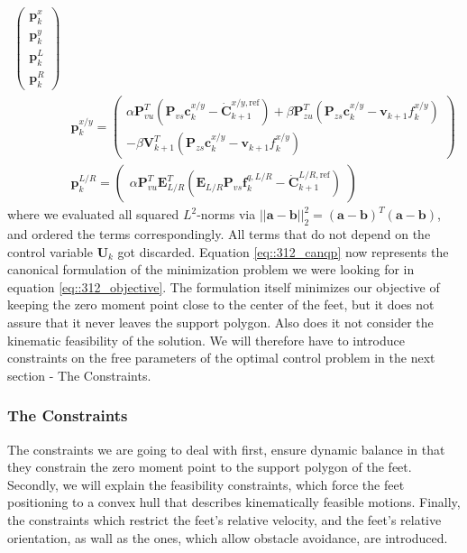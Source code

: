 \begin{align}
\begin{pmatrix}
		\bm{p}_k^x \\
		\bm{p}_k^y \\
		\bm{p}_k^{L} \\
		\bm{p}_k^{R}
	\end{pmatrix} \\
	& \bm{p}_k^{x/y} = \begin{pmatrix}
		\alpha\bm{P}_{vu}^T(\bm{P}_{vs}\bm{c}_k^{x/y}-\dot{\bm{C}}_{k+1}^{x/y,\text{ref}}) + \beta\bm{P}_{zu}^T(\bm{P}_{zs}\bm{c}_k^{x/y}-\bm{v}_{k+1}f_k^{x/y})\\
		-\beta\bm{V}_{k+1}^T(\bm{P}_{zs}\bm{c}_k^{x/y}-\bm{v}_{k+1}f_k^{x/y})
	\end{pmatrix} \\
	& \bm{p}_k^{L/R} = \begin{pmatrix}
		\alpha\bm{P}_{vu}^T\bm{E}_{L/R}^T(\bm{E}_{L/R}\bm{P}_{vs}\bm{f}_k^{q,L/R}-\dot{\bm{C}}_{k+1}^{L/R,\text{ref}})
	\end{pmatrix}
\end{align}
where we evaluated all squared $L^2$-norms via $||\bm{a}-\bm{b}||^2_2 = (\bm{a}-\bm{b})^T(\bm{a}-\bm{b})$, and ordered the terms correspondingly. All terms that do not depend on the control variable $\bm{U}_k$ got discarded. Equation \ref{eq::312_canqp} now represents the canonical formulation of the minimization problem we were looking for in equation \ref{eq::312_objective}. The formulation itself minimizes our objective of keeping the zero moment point close to the center of the feet, but it does not assure that it never leaves the support polygon. Also does it not consider the kinematic feasibility of the solution. We will therefore have to introduce constraints on the free parameters of the optimal control problem in the next section - The Constraints.
\subsubsection{The Constraints}
The constraints we are going to deal with first, ensure dynamic balance in that they constrain the zero moment point to the support polygon of the feet. Secondly, we will explain the feasibility constraints, which force the feet positioning to a convex hull that describes kinematically feasible motions. Finally, the constraints which restrict the feet's relative velocity, and the feet's relative orientation, as wall as the ones, which allow obstacle avoidance, are introduced.
